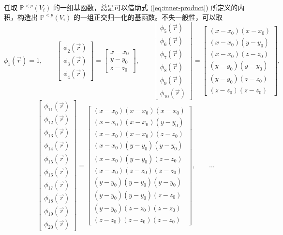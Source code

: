 任取 $\mathbb{P}^{<p}(V_{i})$ 的一组基函数，总是可以借助式 (\ref{eq:inner-product})
所定义的内积，构造出 $\mathbb{P}^{<p}(V_{i})$ 的一组正交归一化的基函数。不失一般性，可以取
\begin{equation}
\phi_{1}(\vec{r})=1,\qquad\begin{bmatrix}\phi_{2}(\vec{r})\\
\phi_{3}(\vec{r})\\
\phi_{4}(\vec{r})
\end{bmatrix}=\begin{bmatrix}x-x_{0}\\
y-y_{0}\\
z-z_{0}
\end{bmatrix},\qquad\begin{bmatrix}\phi_{5}(\vec{r})\\
\phi_{6}(\vec{r})\\
\phi_{7}(\vec{r})\\
\phi_{8}(\vec{r})\\
\phi_{9}(\vec{r})\\
\phi_{10}(\vec{r})
\end{bmatrix}=\begin{bmatrix}(x-x_{0})(x-x_{0})\\
(x-x_{0})(y-y_{0})\\
(x-x_{0})(z-z_{0})\\
(y-y_{0})(y-y_{0})\\
(y-y_{0})(z-z_{0})\\
(z-z_{0})(z-z_{0})
\end{bmatrix},
\end{equation}
\begin{equation}
\begin{bmatrix}\phi_{11}(\vec{r})\\
\phi_{12}(\vec{r})\\
\phi_{13}(\vec{r})\\
\phi_{14}(\vec{r})\\
\phi_{15}(\vec{r})\\
\phi_{16}(\vec{r})\\
\phi_{17}(\vec{r})\\
\phi_{18}(\vec{r})\\
\phi_{19}(\vec{r})\\
\phi_{20}(\vec{r})
\end{bmatrix}=\begin{bmatrix}(x-x_{0})(x-x_{0})(x-x_{0})\\
(x-x_{0})(x-x_{0})(y-y_{0})\\
(x-x_{0})(x-x_{0})(z-z_{0})\\
(x-x_{0})(y-y_{0})(y-y_{0})\\
(x-x_{0})(y-y_{0})(z-z_{0})\\
(x-x_{0})(z-z_{0})(z-z_{0})\\
(y-y_{0})(y-y_{0})(y-y_{0})\\
(y-y_{0})(y-y_{0})(z-z_{0})\\
(y-y_{0})(z-z_{0})(z-z_{0})\\
(z-z_{0})(z-z_{0})(z-z_{0})
\end{bmatrix},\qquad\dots
\end{equation}
